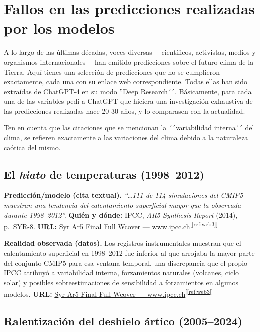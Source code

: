 \documentclass[
  10pt,
  a4paper,
  DIV=11,
  numbers=noendperiod,
  open=any]{scrreprt}
\numberwithin{equation}{chapter}
\numberwithin{equation}{section}
\renewcommand{\[}{\begin{equation}}
\renewcommand{\]}{\end{equation}}
\newcommand{\refweb}[3]{%
  \href{#1}{#2}\textsuperscript{[\ref{ref:#3}]}%
}
\begin{document}
\section{Fallos en las predicciones realizadas por los
modelos}\label{otros-fallos-en-las-predicciones-realizadas-por-los-modelos}

A lo largo de las últimas décadas, voces diversas ---científicos,
activistas, medios y organismos internacionales--- han emitido predicciones sobre el futuro clima de la Tierra. Aquí tienes una
selección de predicciones que no se cumplieron exactamente, cada una con su enlace
web correspondiente. Todas ellas han sido extraídas de ChatGPT-4 en su modo ''Deep Research´´. Básicamente, para cada una de las variables pedí a ChatGPT que hiciera una investigación exhaustiva de las predicciones realizadas hace 20-30 años, y lo comparasen con la actualidad.

Ten en cuenta que las citaciones que se mencionan la ´´variabilidad interna´´ del clima, se refieren exactamente a las variaciones del clima debido a la naturaleza caótica del mismo.


\subsection{El \textit{hiato} de temperaturas (1998–2012)}

\textbf{Predicción/modelo (cita textual).}
\emph{“\dots{}111 de 114 simulaciones del CMIP5 muestran una tendencia del calentamiento superficial mayor que la observada durante 1998–2012”.}
\textbf{Quién y dónde:} IPCC, \textit{AR5 Synthesis Report} (2014), p.~SYR-8.
\textbf{URL:} \refweb{https://www.ipcc.ch/site/assets/uploads/2018/05/SYR_AR5_FINAL_full_wcover.pdf}{Syr Ar5 Final Full Wcover — www.ipcc.ch}{web3}

\textbf{Realidad observada (datos).}
Los registros instrumentales muestran que el calentamiento superficial en 1998–2012 fue inferior al que arrojaba la mayor parte del conjunto CMIP5 para esa ventana temporal, una discrepancia que el propio IPCC atribuyó a variabilidad interna, forzamientos naturales (volcanes, ciclo solar) y posibles sobreestimaciones de sensibilidad a forzamientos en algunos modelos.
\textbf{URL:} \refweb{https://www.ipcc.ch/site/assets/uploads/2018/05/SYR_AR5_FINAL_full_wcover.pdf}{Syr Ar5 Final Full Wcover — www.ipcc.ch}{web3}

\medskip

\subsection{Ralentización del deshielo ártico (2005–2024)}
\end{document}
